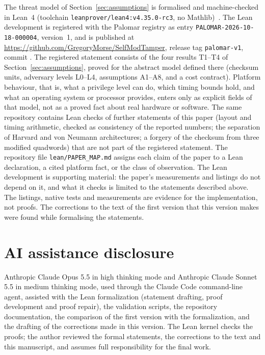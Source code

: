 \documentclass[11pt]{article}
\begin{document}
\begin{sloppypar}
The threat model of Section~\ref{sec:assumptions} is formalised and machine-checked in Lean~4 (toolchain \texttt{leanprover/lean4:v4.35.0-rc3}, no Mathlib)~\cite{smctamper-lean}.
The Lean development is registered with the Palomar registry as entry \texttt{PALOMAR-2026-10-18-000004}, version~1, and is published at \url{https://github.com/GregoryMorse/SelfModTamper}, release tag \texttt{palomar-v1}, commit .
The registered statement consists of the four results T1--T4 of Section~\ref{sec:assumptions}, proved for the abstract model defined there (checksum units, adversary levels L0--L4, assumptions A1--A8, and a cost contract).
Platform behaviour, that is, what a privilege level can do, which timing bounds hold, and what an operating system or processor provides, enters only as explicit fields of that model, not as a proved fact about real hardware or software.
The same repository contains Lean checks of further statements of this paper (layout and timing arithmetic, checked as consistency of the reported numbers; the separation of Harvard and von Neumann architectures; a forgery of the checksum from three modified quadwords) that are not part of the registered statement.
The repository file \texttt{lean/PAPER\_MAP.md} assigns each claim of the paper to a Lean declaration, a cited platform fact, or the class of observation.
The Lean development is supporting material: the paper's measurements and listings do not depend on it, and what it checks is limited to the statements described above.
The listings, native tests and measurements are evidence for the implementation, not proofs.
The corrections to the text of the first version that this version makes were found while formalising the statements.
\end{sloppypar}
\section*{AI assistance disclosure}

Anthropic Claude Opus 5.5 in high thinking mode and Anthropic Claude Sonnet 5.5 in medium thinking mode, used through the Claude Code command-line agent, assisted with the Lean formalization (statement drafting, proof development and proof repair), the validation scripts, the repository documentation, the comparison of the first version with the formalization, and the drafting of the corrections made in this version.
The Lean kernel checks the proofs; the author reviewed the formal statements, the corrections to the text and this manuscript, and assumes full responsibility for the final work.



\end{document}
